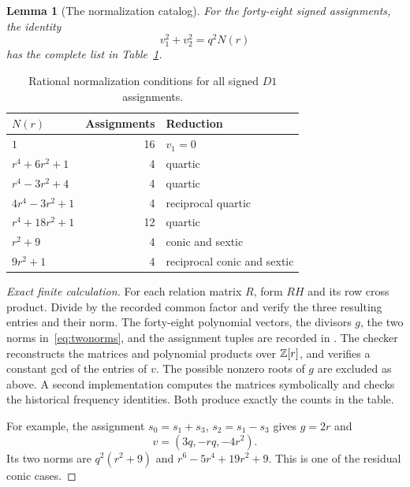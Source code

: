 \documentclass[11pt,letterpaper]{article}
\newtheorem{lemma}[theorem]{Lemma}
\theoremstyle{definition}\newtheorem{definition}[theorem]{Definition}
\theoremstyle{remark}\newtheorem{remark}[theorem]{Remark}
\begin{document}
\begin{lemma}[The normalization catalog]\label{lem:normcatalog}
For the forty-eight signed assignments, the identity
\[
 v_1^2+v_2^2=q^2N(r)
\]
has the complete list in Table~\ref{tab:normcatalog}.
\end{lemma}
\begin{table}[htbp]
\centering
\begin{tabular}{lrl}
\toprule
$N(r)$ & Assignments & Reduction\\
\midrule
$1$ &16& $v_1=0$\\
$r^4+6r^2+1$ &4& quartic\\
$r^4-3r^2+4$ &4& quartic\\
$4r^4-3r^2+1$ &4& reciprocal quartic\\
$r^4+18r^2+1$ &12& quartic\\
$r^2+9$ &4& conic and sextic\\
$9r^2+1$ &4& reciprocal conic and sextic\\
\bottomrule
\end{tabular}
\caption{Rational normalization conditions for all signed $D1$ assignments.}\label{tab:normcatalog}
\end{table}
\begin{proof}[Exact finite calculation]
For each relation matrix $R$, form $RH$ and its row cross product. Divide by the recorded common factor and verify the three resulting entries and their norm. The forty-eight polynomial vectors, the divisors $g$, the two norms in~\eqref{eq:twonorms}, and the assignment tuples are recorded in . The checker reconstructs the matrices and polynomial products over $\mathbb Z[r]$, and verifies a constant gcd of the entries of $v$. The possible nonzero roots of $g$ are excluded as above. A second implementation computes the matrices symbolically and checks the historical frequency identities. Both produce exactly the counts in the table.

For example, the assignment $s_0=s_1+s_3$, $s_2=s_1-s_3$ gives $g=2r$ and
\[
 v=(3q,-rq,-4r^2).
\]
Its two norms are $q^2(r^2+9)$ and $r^6-5r^4+19r^2+9$. This is one of the residual conic cases.
\end{proof}
\end{document}
